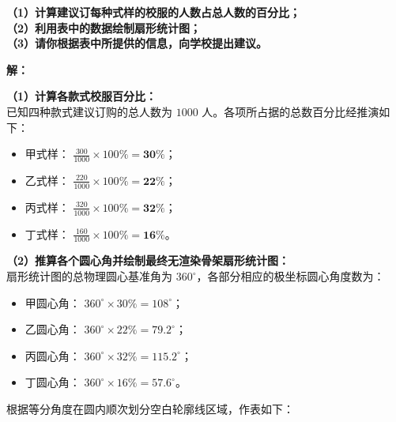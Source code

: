 \textbf{（1）计算建议订每种式样的校服的人数占总人数的百分比；}\\
\textbf{（2）利用表中的数据绘制扇形统计图；}\\
\textbf{（3）请你根据表中所提供的信息，向学校提出建议。}

\vspace{0.4cm}

\textbf{解：}

\textbf{（1）计算各款式校服百分比：} \\
已知四种款式建议订购的总人数为 $1000$ 人。各项所占据的总数百分比经推演如下：
\begin{itemize}
  \item 甲式样： $\frac{300}{1000} \times 100\% = \boldsymbol{30\%}$；
  \item 乙式样： $\frac{220}{1000} \times 100\% = \boldsymbol{22\%}$；
  \item 丙式样： $\frac{320}{1000} \times 100\% = \boldsymbol{32\%}$；
  \item 丁式样： $\frac{160}{1000} \times 100\% = \boldsymbol{16\%}$。
\end{itemize}

\textbf{（2）推算各个圆心角并绘制最终无渲染骨架扇形统计图：} \\
扇形统计图的总物理圆心基准角为 $360^\circ$，各部分相应的极坐标圆心角度数为：
\begin{itemize}
  \item 甲圆心角： $360^\circ \times 30\% = 108^\circ$；
  \item 乙圆心角： $360^\circ \times 22\% = 79.2^\circ$；
  \item 丙圆心角： $360^\circ \times 32\% = 115.2^\circ$；
  \item 丁圆心角： $360^\circ \times 16\% = 57.6^\circ$。
\end{itemize}

根据等分角度在圆内顺次划分空白轮廓线区域，作表如下：

